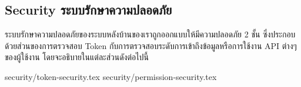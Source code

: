 \subsection{
\ifenglish Security 
\else ระบบรักษาความปลอดภัย 
\fi}

\ifenglish
\else
ระบบรักษาความปลอดภัยของระบบหลังบ้านของเราถูกออกแบบให้มีความปลอดภัย 2 ชั้น ซึ่งประกอบด้วยส่วนของการตรวจสอบ Token กับการตรวจสอบระดับการเข้าถึงข้อมูลหรือการใช้งาน API ต่างๆ ของผู้ใช้งาน โดยจะอธิบายในแต่ละส่วนดังต่อไปนี้

{security/token-security.tex}
{security/permission-security.tex}
\fi